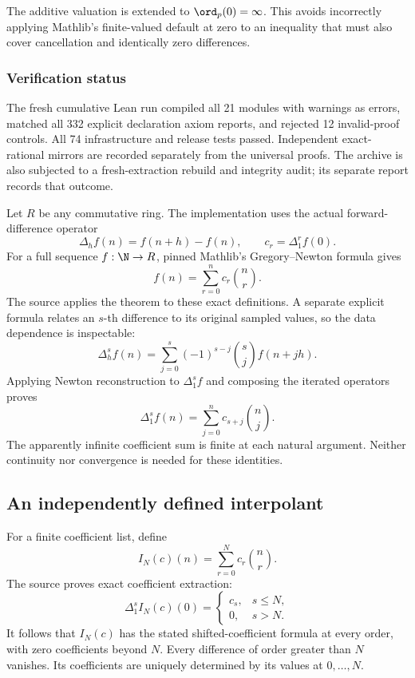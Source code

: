 The additive valuation is extended to $\ord_p(0)=\infty$. This avoids incorrectly applying Mathlib's finite-valued default at zero to an inequality that must also cover cancellation and identically zero differences.

\subsubsection*{Verification status}
The fresh cumulative Lean run compiled all 21 modules with warnings as errors, matched all 332 explicit declaration axiom reports, and rejected 12 invalid-proof controls. All 74 infrastructure and release tests passed. Independent exact-rational mirrors are recorded separately from the universal proofs. The archive is also subjected to a fresh-extraction rebuild and integrity audit; its separate report records that outcome.
\par\medskip
{}
Let $R$ be any commutative ring. The implementation uses the actual forward-difference operator
\[
 \Delta_h f(n)=f(n+h)-f(n),\qquad c_r=\Delta_1^r f(0).
\]
For a full sequence $f:\N\to R$, pinned Mathlib's Gregory--Newton formula gives
\[
 \boxed{f(n)=\sum_{r=0}^{n}c_r\binom nr.}
\]
The source applies the theorem to these exact definitions. A separate explicit formula relates an $s$-th difference to its original sampled values, so the data dependence is inspectable:
\[
 \Delta_h^s f(n)=\sum_{j=0}^{s}(-1)^{s-j}\binom sj f(n+jh).
\]
Applying Newton reconstruction to $\Delta_1^s f$ and composing the iterated operators proves
\[
 \boxed{\Delta_1^s f(n)=\sum_{j=0}^{n}c_{s+j}\binom nj.}
\]
The apparently infinite coefficient sum is finite at each natural argument. Neither continuity nor convergence is needed for these identities.

\subsection*{An independently defined interpolant}
For a finite coefficient list, define
\[
 I_N(c)(n)=\sum_{r=0}^{N}c_r\binom nr.
\]
The source proves exact coefficient extraction:
\[
 \Delta_1^s I_N(c)(0)=
 \begin{cases}c_s,&s\leq N,\\0,&s>N.\end{cases}
\]
It follows that $I_N(c)$ has the stated shifted-coefficient formula at every order, with zero coefficients beyond $N$. Every difference of order greater than $N$ vanishes. Its coefficients are uniquely determined by its values at $0,\ldots,N$.

